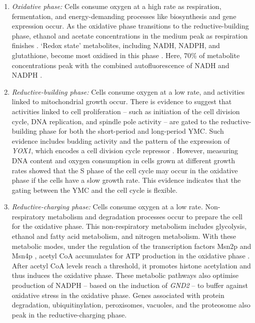 \begin{enumerate}
  \item \emph{Oxidative phase:} Cells consume oxygen at a high rate as respiration, fermentation, and energy-demanding processes like biosynthesis and gene expression occur.
    As the oxidative phase transitions to the reductive-building phase, ethanol and acetate concentrations in the medium peak as respiration finishes \citep{tuLogicYeastMetabolic2005}.
    `Redox state' metabolites, including NADH, NADPH, and glutathione, become most oxidised in this phase \citep{lloydUltradianMetronomeTimekeeper2005}.
Here, 70\% of metabolite concentrations peak with the combined autofluorescence of NADH and NADPH \citep{murrayRegulationYeastOscillatory2007}.
\item \emph{Reductive-building phase:} Cells consume oxygen at a low rate, and activities linked to mitochondrial growth occur.
  There is evidence to suggest that activities linked to cell proliferation -- such as initiation of the cell division cycle, DNA replication, and spindle pole activity -- are gated to the reductive-building phase for both the short-period and long-period YMC.
  Such evidence includes budding activity and the pattern of the expression of \emph{YOX1}, which encodes a cell division cycle repressor \citep{tuLogicYeastMetabolic2005}.
  However, measuring DNA content and oxygen consumption in cells grown at different growth rates \citep{slavovCouplingGrowthRate2011} showed that the S phase of the cell cycle may occur in the oxidative phase if the cells have a slow growth rate.
  This evidence indicates that the gating between the YMC and the cell cycle is flexible.
\item \emph{Reductive-charging phase:} Cells consume oxygen at a low rate.
  Non-respiratory metabolism and degradation processes occur to prepare the cell for the oxidative phase.
  This non-respiratory metabolism includes glycolysis, ethanol and fatty acid metabolism, and nitrogen metabolism.
  With these metabolic modes, under the regulation of the transcription factors Msn2p and Msn4p \citep{kuangMsn2RegulateExpression2017}, acetyl CoA accumulates for ATP production in the oxidative phase \citep{tuLogicYeastMetabolic2005}.
After acetyl CoA levels reach a threshold, it promotes histone acetylation and thus induces the oxidative phase.
These metabolic pathways also optimise production of NADPH -- based on the induction of \emph{GND2} -- to buffer against oxidative stress in the oxidative phase.
Genes associated with protein degradation, ubiquitinylation, peroxisomes, vacuoles, and the proteosome also peak in the reductive-charging phase.
\end{enumerate}

